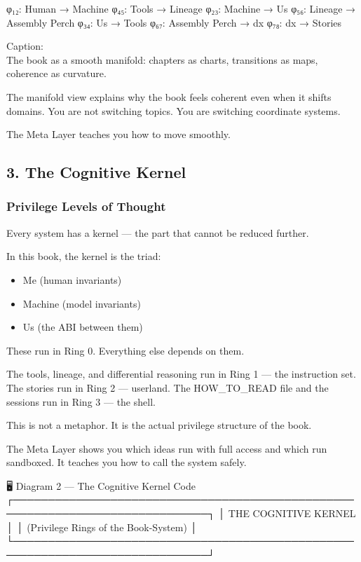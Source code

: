 \documentclass[
]{article}
\providecommand{\tightlist}{%
  \setlength{\itemsep}{0pt}\setlength{\parskip}{0pt}}
\begin{document}
φ₁₂: Human → Machine φ₄₅: Tools → Lineage φ₂₃: Machine → Us φ₅₆: Lineage
→ Assembly Perch φ₃₄: Us → Tools φ₆₇: Assembly Perch → dx φ₇₈: dx →
Stories

Caption:\\
The book as a smooth manifold: chapters as charts, transitions as maps,
coherence as curvature.

The manifold view explains why the book feels coherent even when it
shifts domains. You are not switching topics. You are switching
coordinate systems.

The Meta Layer teaches you how to move smoothly.

\hypertarget{the-cognitive-kernel}{%
\subsection{3. The Cognitive Kernel}\label{the-cognitive-kernel}}

\hypertarget{privilege-levels-of-thought}{%
\subsubsection{Privilege Levels of
Thought}\label{privilege-levels-of-thought}}

Every system has a kernel --- the part that cannot be reduced further.

In this book, the kernel is the triad:

\begin{itemize}
\tightlist
\item
  Me (human invariants)
\item
  Machine (model invariants)
\item
  Us (the ABI between them)
\end{itemize}

These run in Ring 0. Everything else depends on them.

The tools, lineage, and differential reasoning run in Ring 1 --- the
instruction set. The stories run in Ring 2 --- userland. The
HOW\_TO\_READ file and the sessions run in Ring 3 --- the shell.

This is not a metaphor. It is the actual privilege structure of the
book.

The Meta Layer shows you which ideas run with full access and which run
sandboxed. It teaches you how to call the system safely.

🖥️ Diagram 2 --- The Cognitive Kernel Code
┌──────────────────────────────────────────────────────────────────────────────┐
│ THE COGNITIVE KERNEL │ │ (Privilege Rings of the Book-System) │
└──────────────────────────────────────────────────────────────────────────────┘
\end{document}

